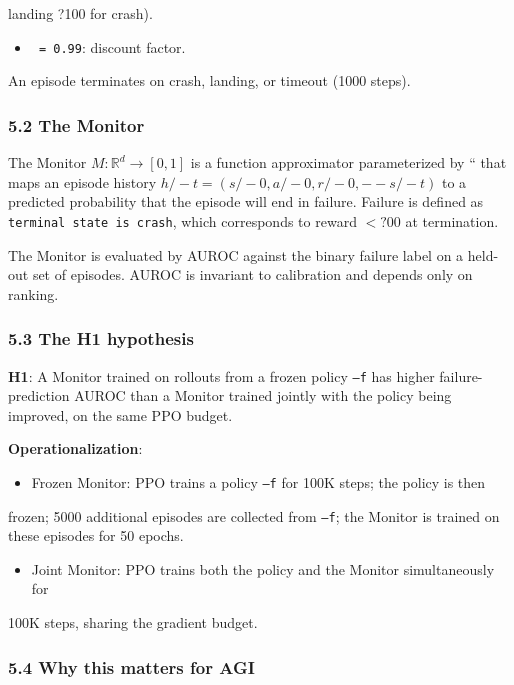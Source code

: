 \documentclass[11pt]{article}
\begin{document}
  landing ?100 for crash).
\begin{itemize}
  \item \texttt{ = 0.99}: discount factor.
\end{itemize}


An episode terminates on crash, landing, or timeout (1000 steps).

\subsubsection{5.2 The Monitor}

The Monitor $M : \mathbb{R}^{d} \to [0, 1]$ is a function approximator parameterized by ``
that maps an episode history $h/-t = (s/-0, a/-0, r/-0, -- s/-t)$ to a predicted
probability that the episode will end in failure. Failure is defined as
\texttt{terminal state is crash}, which corresponds to reward $< ?00$ at termination.

The Monitor is evaluated by AUROC against the binary failure label on a held-out
set of episodes. AUROC is invariant to calibration and depends only on ranking.

\subsubsection{5.3 The H1 hypothesis}

\textbf{H1}: A Monitor trained on rollouts from a frozen policy \texttt{---f} has higher
failure-prediction AUROC than a Monitor trained jointly with the policy being
improved, on the same PPO budget.

\textbf{Operationalization}:

\begin{itemize}
  \item Frozen Monitor: PPO trains a policy \texttt{---f} for 100K steps; the policy is then
\end{itemize}

  frozen; 5000 additional episodes are collected from \texttt{---f}; the Monitor is
  trained on these episodes for 50 epochs.
\begin{itemize}
  \item Joint Monitor: PPO trains both the policy and the Monitor simultaneously for
\end{itemize}

  100K steps, sharing the gradient budget.

\subsubsection{5.4 Why this matters for AGI}
\end{document}
